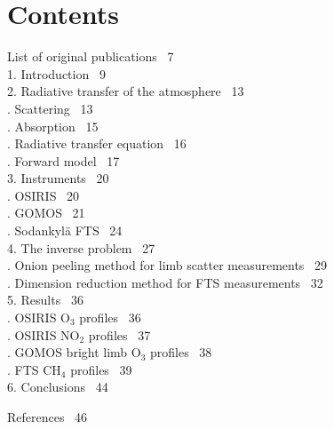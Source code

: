\documentclass[11pt,b5paper]{book}
\begin{document}
\section*{Contents}
\vspace*{0.5cm}

\thispagestyle{empty}

\indent List of original publications \dotfill\ 7\\
1. Introduction \dotfill\ 9\\
2. Radiative transfer of the atmosphere \dotfill\ 13\\
. Scattering \dotfill\ 13\\
. Absorption \dotfill\ 15\\
. Radiative transfer equation \dotfill\ 16\\ 
. Forward model \dotfill\ 17\\
3. Instruments \dotfill\ 20\\
. OSIRIS \dotfill\ 20\\
. GOMOS \dotfill\ 21\\
. Sodankylä FTS \dotfill\ 24\\
4. The inverse problem \dotfill\ 27\\
. Onion peeling method for limb scatter measurements \dotfill\ 29\\
. Dimension reduction method for FTS measurements \dotfill\ 32\\
5. Results \dotfill\ 36\\
. OSIRIS O$_3$ profiles \dotfill\ 36\\
. OSIRIS NO$_2$ profiles \dotfill\ 37\\
. GOMOS bright limb O$_3$ profiles \dotfill\ 38\\
. FTS CH$_4$ profiles \dotfill\ 39\\
6. Conclusions \dotfill\ 44\\

\vspace{0.25cm}

\noindent{}References \dotfill\ 46\\

\newpage

\vspace*{2cm}
\end{document}
